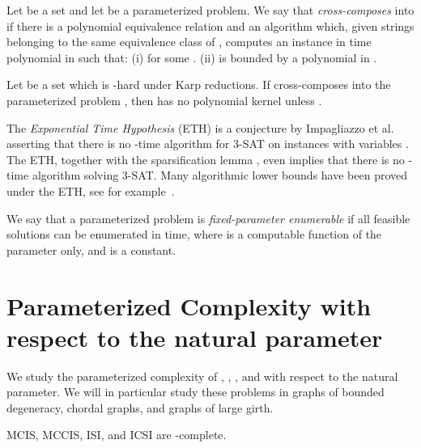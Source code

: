 \begin{definition} Let  be 
a set and let  be a parameterized problem. We say 
that  \emph{cross-composes} into  if there is a polynomial equivalence relation 
 and an algorithm which, given  strings  belonging to the 
same equivalence class of , computes an instance  
in time polynomial in  such that: (i)  for some . (ii)  is bounded by a polynomial in .

\end{definition}

\begin{proposition}
Let  be a set which is -hard under Karp reductions. If 
 cross-composes into the parameterized problem , then  has no polynomial 
kernel unless .
\end{proposition}


The \emph{Exponential Time Hypothesis} (ETH) is a conjecture by Impagliazzo et al. asserting that there is no -time algorithm for \textsc{3-SAT} on instances with  variables \cite{ImpagliazzoETH}. 
The ETH, together with the sparsification lemma \cite{ImpagliazzoETH}, even implies that there is no -time algorithm solving \textsc{3-SAT}.
Many algorithmic lower bounds have been proved under the ETH, see for example~\cite{LokshtanovSODA}.


We say that a parameterized problem is {\em fixed-parameter enumerable} if all feasible solutions can be enumerated in  time, where  is a computable function of the parameter  only, and  is a constant.

\section{Parameterized Complexity with respect to the natural parameter}\label{sec:nat}


We study the parameterized complexity of \isi, \mcis, \icsi, and \mccis with 
respect to the natural parameter. 
We will in particular study these problems in 
graphs of bounded degeneracy, chordal graphs, and graphs of large girth.



\begin{theorem}\label{thm:complete}
MCIS, MCCIS, ISI, and ICSI are -complete.
\end{theorem}

